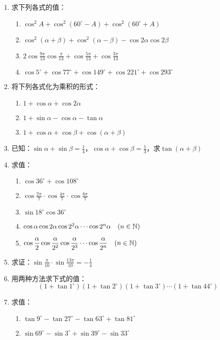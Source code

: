\begin{enumerate}
\item 求下列各式的值：
\begin{enumerate}[(1)]
    \item $\cos^2 A+\cos^2(60^{\circ}-A)+\cos^2(60^{\circ}+A)$
    \item $\cos^2 (\alpha+\beta)+\cos^2 (\alpha-\beta)-\cos2\alpha\cos2\beta$
    \item $2\cos\frac{9\pi}{13}\cos\frac{\pi}{13}+\cos\frac{5\pi}{13}+\cos\frac{3\pi}{13}$
    \item $\cos5^{\circ}+\cos77^{\circ}+\cos 149^{\circ}+\cos 221^{\circ}+\cos293^{\circ}$
\end{enumerate}
\item 将下列各式化为乘积的形式：
\begin{multicols}{2}
\begin{enumerate}[(1)]
    \item $1+\cos\alpha+\cos2\alpha$
    \item $1+\sin\alpha-\cos\alpha-\tan\alpha$
    \item $1+\cos\alpha+\cos\beta+\cos(\alpha+\beta)$
\end{enumerate}    
\end{multicols}
\item 已知：$\sin\alpha+\sin\beta=\frac{1}{4}$，$\cos\alpha+\cos\beta=\frac{1}{3}$，求$\tan(\alpha+\beta)$
\item 求值：
\begin{enumerate}[(1)]
    \item $\cos 36^{\circ}+\cos 108^{\circ}$
    \item $\cos\frac{2\pi}{7}\cdot \cos\frac{4\pi}{7}\cdot \cos\frac{6\pi}{7}$
    \item $\sin 18^{\circ}\cos 36^{\circ}$
    \item $\cos\alpha\cos2\alpha\cos2^2\alpha\cdots \cos 2^n\alpha\quad (n\in\mathbb{N})$
    \item $\cos\dfrac{\alpha}{2}\cos\dfrac{\alpha}{2^2}\cos\dfrac{\alpha}{2^3}\cdots \cos\dfrac{\alpha}{2^n}\quad (n\in\mathbb{N})$
\end{enumerate}

\item 求证：$\sin\frac{\pi}{10}\cdot \sin\frac{13\pi}{10}=-\frac{1}{4}$
\item 用两种方法求下式的值：
\[(1+\tan1^{\circ})(1+\tan2^{\circ})(1+\tan3^{\circ})\cdots (1+\tan44^{\circ})\]
\item 求值：
\begin{enumerate}[(1)]
    \item $\tan9^{\circ}-\tan27^{\circ}-\tan63^{\circ}+\tan81^{\circ}$
    \item $\sin 69^{\circ}-\sin 3^{\circ}+\sin 39^{\circ}-\sin 33^{\circ}$
\end{enumerate}    


\end{enumerate}
